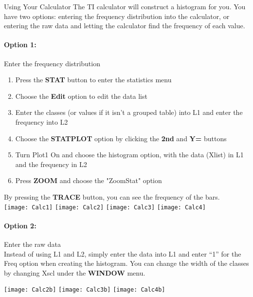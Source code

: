 \begin{proc}{Using Your Calculator}
The TI calculator will construct a histogram for you.  You have two options: entering the frequency distribution into the calculator, or entering the raw data and letting the calculator find the frequency of each value.

\paragraph{Option 1:} Enter the frequency distribution
\begin{enumerate}
\item Press the \textbf{STAT} button to enter the statistics menu
\item Choose the \textbf{Edit} option to edit the data list
\item Enter the classes (or values if it isn't a grouped table) into L1 and enter the frequency into L2
\item Choose the \textbf{STATPLOT} option by clicking the \textbf{2nd} and \textbf{Y=} buttons
\item Turn Plot1 On and choose the histogram option, with the data (Xlist) in L1 and the frequency in L2
\item Press \textbf{ZOOM} and choose the "ZoomStat" option
\end{enumerate}
By pressing the \textbf{TRACE} button, you can see the frequency of the bars.\\

\texttt{[image: Calc1]}
\texttt{[image: Calc2]}
\texttt{[image: Calc3]}
\texttt{[image: Calc4]}

\paragraph{Option 2:} Enter the raw data\\

Instead of using L1 and L2, simply enter the data into L1 and enter ``1'' for the Freq option when creating the histogram.  You can change the width of the classes by changing Xscl under the \textbf{WINDOW} menu.
\begin{center}
\texttt{[image: Calc2b]}
\texttt{[image: Calc3b]}
\texttt{[image: Calc4b]}
\end{center}
\end{proc}
\vspace{0.5in}

